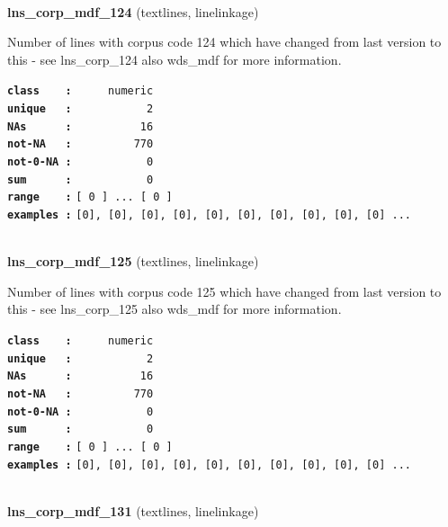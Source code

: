 \documentclass[]{article}
\begin{document}
~

\textbf{lns\_corp\_mdf\_124} (textlines, linelinkage)

Number of lines with corpus code 124 which have changed from last
version to this - see lns\_corp\_124 also wds\_mdf for more information.

\textbf{\texttt{class\ \ \ \ :}} \texttt{~~~~~numeric}\\
\textbf{\texttt{unique\ \ \ :}} \texttt{~~~~~~~~~~~2}\\
\textbf{\texttt{NAs\ \ \ \ \ \ :}} \texttt{~~~~~~~~~~16}\\
\textbf{\texttt{not-NA\ \ \ :}} \texttt{~~~~~~~~~770}\\
\textbf{\texttt{not-0-NA\ :}} \texttt{~~~~~~~~~~~0}\\
\textbf{\texttt{sum\ \ \ \ \ \ :}} \texttt{~~~~~~~~~~~0}\\
\textbf{\texttt{range\ \ \ \ :}}
\texttt{{[}\ 0\ {]}\ ...\ {[}\ 0\ {]}}\\
\textbf{\texttt{examples\ :}}
\texttt{{[}0{]},\ {[}0{]},\ {[}0{]},\ {[}0{]},\ {[}0{]},\ {[}0{]},\ {[}0{]},\ {[}0{]},\ {[}0{]},\ {[}0{]}\ ...}\\

~

\textbf{lns\_corp\_mdf\_125} (textlines, linelinkage)

Number of lines with corpus code 125 which have changed from last
version to this - see lns\_corp\_125 also wds\_mdf for more information.

\textbf{\texttt{class\ \ \ \ :}} \texttt{~~~~~numeric}\\
\textbf{\texttt{unique\ \ \ :}} \texttt{~~~~~~~~~~~2}\\
\textbf{\texttt{NAs\ \ \ \ \ \ :}} \texttt{~~~~~~~~~~16}\\
\textbf{\texttt{not-NA\ \ \ :}} \texttt{~~~~~~~~~770}\\
\textbf{\texttt{not-0-NA\ :}} \texttt{~~~~~~~~~~~0}\\
\textbf{\texttt{sum\ \ \ \ \ \ :}} \texttt{~~~~~~~~~~~0}\\
\textbf{\texttt{range\ \ \ \ :}}
\texttt{{[}\ 0\ {]}\ ...\ {[}\ 0\ {]}}\\
\textbf{\texttt{examples\ :}}
\texttt{{[}0{]},\ {[}0{]},\ {[}0{]},\ {[}0{]},\ {[}0{]},\ {[}0{]},\ {[}0{]},\ {[}0{]},\ {[}0{]},\ {[}0{]}\ ...}\\

~

\textbf{lns\_corp\_mdf\_131} (textlines, linelinkage)
\end{document}
